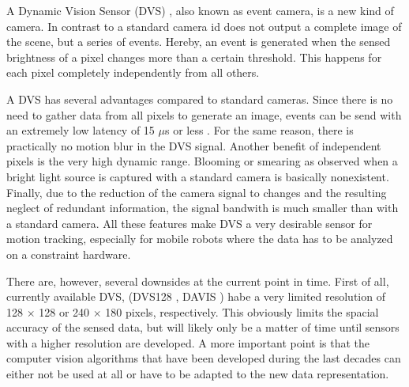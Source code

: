 A Dynamic Vision Sensor (DVS) \cite{lpd08dvs}, also known as event camera, is a new kind of camera. In contrast to a standard camera id does not output a complete image of the scene, but a series of events. Hereby, an event is generated when the sensed brightness of a pixel changes more than a certain threshold. This happens for each pixel completely independently from all others.

A DVS has several advantages compared to standard cameras. Since there is no need to gather data from all pixels to generate an image, events can be send with an extremely low latency of 15 $\mu$s or less \cite{lpd08dvs, bandli14davis}. For the same reason, there is practically no motion blur in the DVS signal. Another benefit of independent pixels is the very high dynamic range. Blooming or smearing as observed when a bright light source is captured with a standard camera is basically nonexistent. Finally, due to the reduction of the camera signal to changes and the resulting neglect of redundant information, the signal bandwith is much smaller than with a standard camera.
All these features make DVS a very desirable sensor for motion tracking, especially for mobile robots where the data has to be analyzed on a constraint hardware.

There are, however, several downsides at the current point in time. First of all, currently available DVS, (DVS128 \cite{lpd08dvs}, DAVIS \cite{brandli14davis}) habe a very limited resolution of 128 $\times$ 128 or 240 $\times$ 180 pixels, respectively. This obviously limits the spacial accuracy of the sensed data, but will likely only be a matter of time until sensors with a higher resolution are developed. A more important point is that the computer vision algorithms that have been developed during the last decades can either not be used at all or have to be adapted to the new data representation.